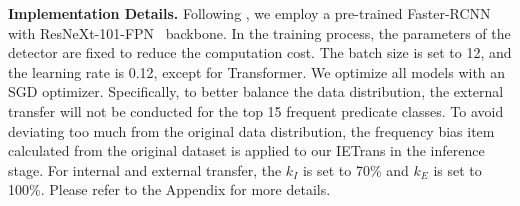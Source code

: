 \documentclass[runningheads]{llncs}
\begin{document}
\smallskip
\noindent
\textbf{Implementation Details.}
Following \cite{tang2020unbiased}, we employ a pre-trained Faster-RCNN~\cite{ren2015faster} with ResNeXt-101-FPN~\cite{lin2017feature,xie2017aggregated} backbone.
In the training process, the parameters of the detector are fixed to reduce the computation cost.
The batch size is set to 12, and the learning rate is 0.12, except for Transformer.
We optimize all models with an SGD optimizer. Specifically, to better balance the data distribution, the external transfer will not be conducted for the top 15 frequent predicate classes.
To avoid deviating too much from the original data distribution, the frequency bias item calculated from the original dataset is applied to our IETrans in the inference stage.
For internal and external transfer, the $k_I$ is set to 70\% and $k_E$ is set to 100\%.
Please refer to the Appendix for more details.
\end{document}
